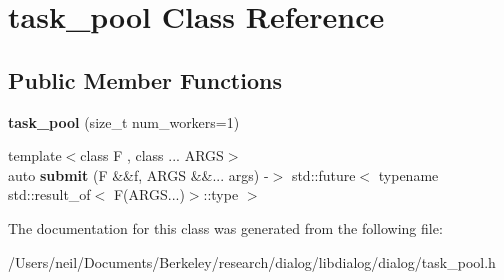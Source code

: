 \hypertarget{classtask__pool}{}\section{task\+\_\+pool Class Reference}
\label{classtask__pool}
\subsection*{Public Member Functions}
\begin{DoxyCompactItemize}
\item 
\mbox{\label{classtask__pool_aa0a3c9689f5cb58670a5b4f523452a59}} 
{\bfseries task\+\_\+pool} (size\+\_\+t num\+\_\+workers=1)
\item 
\mbox{\label{classtask__pool_a1278806d5bf37f76983db19ec64712b5}} 
{\footnotesize template$<$class F , class ... A\+R\+GS$>$ }\\auto {\bfseries submit} (F \&\&f, A\+R\+GS \&\&... args) -\/$>$ std\+::future$<$ typename std\+::result\+\_\+of$<$ F(A\+R\+G\+S...)$>$\+::type $>$
\end{DoxyCompactItemize}


The documentation for this class was generated from the following file\+:\begin{DoxyCompactItemize}
\item 
/\+Users/neil/\+Documents/\+Berkeley/research/dialog/libdialog/dialog/task\+\_\+pool.\+h\end{DoxyCompactItemize}
